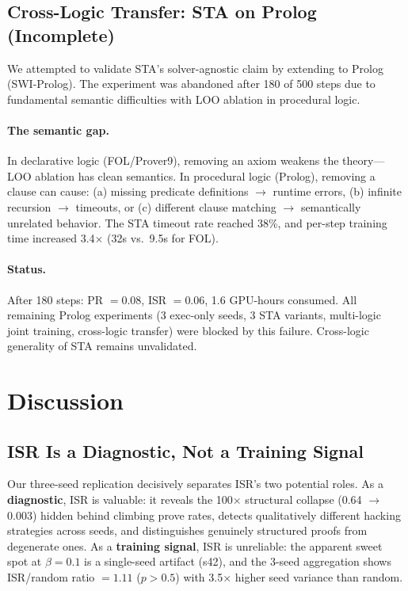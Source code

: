 \documentclass[11pt,a4paper]{article}
\begin{document}
\subsection{Cross-Logic Transfer: STA on Prolog (Incomplete)}
\label{sec:prolog}

We attempted to validate STA's solver-agnostic claim by extending to Prolog (SWI-Prolog).
The experiment was abandoned after 180 of 500 steps due to fundamental semantic difficulties with LOO ablation in procedural logic.

\paragraph{The semantic gap.}
In declarative logic (FOL/Prover9), removing an axiom weakens the theory---LOO ablation has clean semantics.
In procedural logic (Prolog), removing a clause can cause: (a) missing predicate definitions $\rightarrow$ runtime errors, (b) infinite recursion $\rightarrow$ timeouts, or (c) different clause matching $\rightarrow$ semantically unrelated behavior.
The STA timeout rate reached 38\%, and per-step training time increased 3.4$\times$ (32s vs.\ 9.5s for FOL).

\paragraph{Status.}
After 180 steps: PR $= 0.08$, ISR $= 0.06$, 1.6 GPU-hours consumed.
All remaining Prolog experiments (3 exec-only seeds, 3 STA variants, multi-logic joint training, cross-logic transfer) were blocked by this failure.
Cross-logic generality of STA remains unvalidated.

\section{Discussion}
\label{sec:discussion}

\subsection{ISR Is a Diagnostic, Not a Training Signal}

Our three-seed replication decisively separates ISR's two potential roles.
As a \textbf{diagnostic}, ISR is valuable: it reveals the 100$\times$ structural collapse (0.64 $\rightarrow$ 0.003) hidden behind climbing prove rates, detects qualitatively different hacking strategies across seeds, and distinguishes genuinely structured proofs from degenerate ones.
As a \textbf{training signal}, ISR is unreliable: the apparent sweet spot at $\beta{=}0.1$ is a single-seed artifact (s42), and the 3-seed aggregation shows ISR/random ratio $= 1.11$ ($p > 0.5$) with 3.5$\times$ higher seed variance than random.
\end{document}
